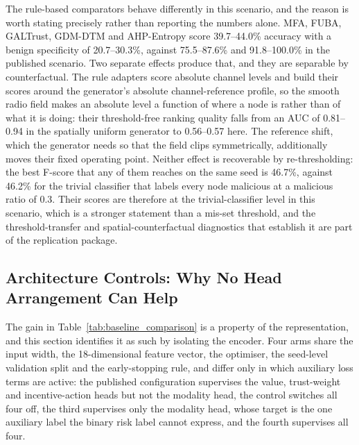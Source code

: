 \documentclass[notspecified,article,submit,moreauthors]{Definitions/mdpi}
\begin{document}
The rule-based comparators behave differently in this scenario, and the reason is worth stating precisely rather than reporting the numbers alone. MFA, FUBA, GALTrust, GDM-DTM and AHP-Entropy score 39.7--44.0\% accuracy with a benign specificity of 20.7--30.3\%, against 75.5--87.6\% and 91.8--100.0\% in the published scenario. Two separate effects produce that, and they are separable by counterfactual. The rule adapters score absolute channel levels and build their scores around the generator's absolute channel-reference profile, so the smooth radio field makes an absolute level a function of where a node is rather than of what it is doing: their threshold-free ranking quality falls from an AUC of 0.81--0.94 in the spatially uniform generator to 0.56--0.57 here. The reference shift, which the generator needs so that the field clips symmetrically, additionally moves their fixed operating point. Neither effect is recoverable by re-thresholding: the best F-score that any of them reaches on the same seed is 46.7\%, against 46.2\% for the trivial classifier that labels every node malicious at a malicious ratio of 0.3. Their scores are therefore at the trivial-classifier level in this scenario, which is a stronger statement than a mis-set threshold, and the threshold-transfer and spatial-counterfactual diagnostics that establish it are part of the replication package.

\subsection{Architecture Controls: Why No Head Arrangement Can Help}
\label{sec:arch_controls}

The gain in Table~\ref{tab:baseline_comparison} is a property of the representation, and this section identifies it as such by isolating the encoder. Four arms share the input width, the 18-dimensional feature vector, the optimiser, the seed-level validation split and the early-stopping rule, and differ only in which auxiliary loss terms are active: the published configuration supervises the value, trust-weight and incentive-action heads but not the modality head, the control switches all four off, the third supervises only the modality head, whose target is the one auxiliary label the binary risk label cannot express, and the fourth supervises all four.
\end{document}
